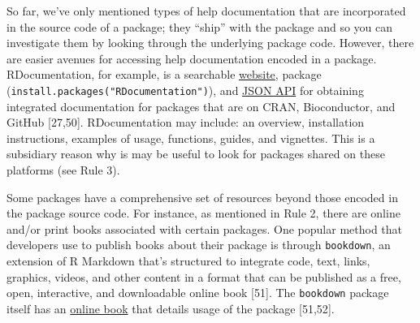 \documentclass[10pt,letterpaper]{article}
\begin{document}
So far, we've only mentioned types of help documentation that are
incorporated in the source code of a package; they ``ship'' with the
package and so you can investigate them by looking through the
underlying package code. However, there are easier avenues for accessing
help documentation encoded in a package. RDocumentation, for example, is
a searchable \href{https://www.rdocumentation.org/}{website}, package
(\texttt{install.packages("RDocumentation")}), and
\href{https://www.rdocumentation.org/docs/}{JSON API} for obtaining
integrated documentation for packages that are on CRAN, Bioconductor,
and GitHub {[}27,50{]}. RDocumentation may include: an overview,
installation instructions, examples of usage, functions, guides, and
vignettes. This is a subsidiary reason why is may be useful to look for
packages shared on these platforms (see Rule 3).

Some packages have a comprehensive set of resources beyond those encoded
in the package source code. For instance, as mentioned in Rule 2, there
are online and/or print books associated with certain packages. One
popular method that developers use to publish books about their package
is through \texttt{bookdown}, an extension of R Markdown that's
structured to integrate code, text, links, graphics, videos, and other
content in a format that can be published as a free, open, interactive,
and downloadable online book {[}51{]}. The \texttt{bookdown} package
itself has an \href{https://bookdown.org/yihui/bookdown/}{online book}
that details usage of the package {[}51,52{]}.
\end{document}
